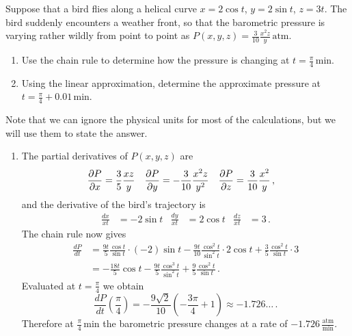\begin{question}
Suppose that a bird flies along a helical curve $x=2 \cos t$, $y = 2 \sin t$, $z=3t$. The bird suddenly encounters a weather front, so that the barometric pressure is varying rather wildly from point to point as $P(x,y,z) = \frac 3{10}\frac{x^2 z}{y} \,\textrm{atm}$.
\begin{enumerate}
\item
Use the chain rule to determine how the pressure is changing at $t = \frac \pi 4 \,\textrm{min}$.
\item
Using the linear approximation, determine the approximate pressure at $t=\frac \pi 4 + 0.01 \,\textrm{min}$.
\end{enumerate}
\end{question}

\begin{solution}
Note that we can ignore the physical units for most of the calculations, but we will use them to state the answer.
\begin{enumerate}
\item
The partial derivatives of $P(x,y,z)$ are
\begin{align*}
\frac{\partial P}{\partial x} &= \frac 35 \frac{xz}y &
\frac{\partial P}{\partial y} &= -\frac 3{10} \frac{x^2z}{y^2} &
\frac{\partial P}{\partial z} &= \frac 3{10} \frac{x^2}y\,,
\end{align*}
and the derivative of the bird's trajectory is
\begin{align*}
\frac{d x}{x t} &= -2 \sin t &
\frac{d y}{x t} &= 2 \cos t &
\frac{d z}{x t} &= 3 \,.
\end{align*}
The chain rule now gives
\begin{align*}
\frac{dP}{dt} &= \frac{9t}5 \frac {\cos t}{\sin t} \cdot (-2) \sin t
- \frac {9t}{10} \frac{\cos^2 t}{\sin^2 t} \cdot 2 \cos t
+ \frac 35 \frac{\cos^2t}{\sin t} \cdot 3 \\
&= -\frac{18t}5 \cos t - \frac{9t}{5} \frac{\cos^3 t}{\sin^2 t}
+ \frac 95 \frac{\cos^2t}{\sin t}\,.
\end{align*}
Evaluated at $t=\frac \pi 4$ we obtain
\[
\frac{dP}{dt}\left(\frac \pi 4\right) = -\frac{9\sqrt{2}}{10}\left(-\frac{3\pi}{4} + 1\right)
\approx - 1.726\ldots\,.
\]
Therefore at $\frac \pi 4 \,\textrm{min}$ the barometric pressure changes at a rate of $-1.726 \,\frac{\textrm{atm}}{\textrm{min}}$.


\end{enumerate}
\end{solution}
